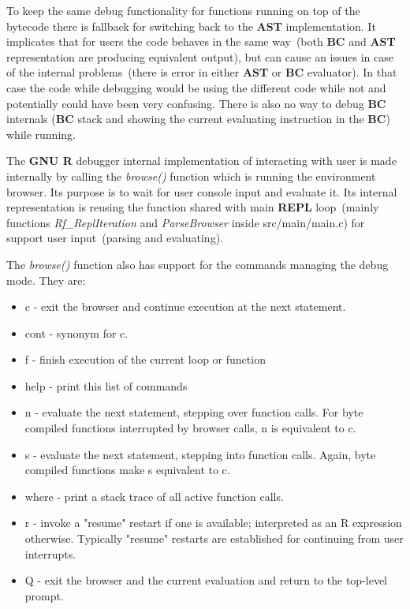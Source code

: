 \documentclass[thesis=M,english]{FITthesis}[2018/10/20]
\begin{document}
To keep the same debug functionality for functions running on top of the bytecode there is fallback for switching back to the \textbf{AST} implementation. It implicates that for users the code behaves in the same way~(both \textbf{BC} and \textbf{AST} representation are producing equivalent output), but can cause an issues in case of the internal problems~(there is error in either \textbf{AST} or \textbf{BC} evaluator). In that case the code while debugging would be using the different code while not and potentially could have been very confusing. There is also no way to debug \textbf{BC} internals (\textbf{BC} stack and showing the current evaluating instruction in the \textbf{BC}) while running.

The \textbf{GNU R} debugger internal implementation of interacting with user is made internally by calling the \textit{browse()} function which is running the environment browser. Its purpose is to wait for user console input and evaluate it. Its internal representation is reusing the function shared with main \textbf{REPL} loop~(mainly functions \textit{Rf{\_}ReplIteration} and \textit{ParseBrowser} inside src/main/main.c) for support user input~(parsing and evaluating).

The \textit{browse()} function also has support for the commands managing the debug mode. They are:
\begin{itemize}
\item c - exit the browser and continue execution at the next statement.
\item cont - synonym for c.
\item f - finish execution of the current loop or function
\item help - print this list of commands
\item n - evaluate the next statement, stepping over function calls. For byte compiled functions  interrupted by browser calls, n is equivalent to c.
\item s - evaluate the next statement, stepping into function calls. Again, byte compiled functions make s equivalent to c.
\item where - print a stack trace of all active function calls.
\item r - invoke a "resume" restart if one is available; interpreted as an R expression otherwise. Typically "resume" restarts are established for continuing from user interrupts.
\item Q - exit the browser and the current evaluation and return to the top-level prompt.

\end{itemize}
\end{document}
